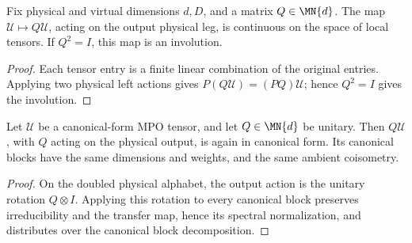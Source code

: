 \begin{lemma}
    \label{thm:mpu_continuous_involutive_left_action}
    \leanok
    Fix physical and virtual dimensions $d,D$, and a matrix $Q\in\MN{d}$.
    The map $\mathcal U\mapsto Q\mathcal U$, acting on the output physical
    leg, is continuous on the space of local tensors. If $Q^2=I$, this map
    is an involution.
\end{lemma}

\begin{proof}\leanok
    Each tensor entry is a finite linear combination of the original entries.
    Applying two physical left actions gives
    $P(Q\mathcal U)=(PQ)\mathcal U$; hence $Q^2=I$ gives the involution.
\end{proof}

\begin{lemma}
    \label{thm:mpu_canonical_form_physical_left_action}
    \leanok
    Let $\mathcal U$ be a canonical-form MPO tensor, and let
    $Q\in\MN{d}$ be unitary. Then $Q\mathcal U$, with $Q$ acting on the
    physical output, is again in canonical form. Its canonical blocks
    have the same dimensions and weights, and the same ambient
    coisometry.
\end{lemma}

\begin{proof}\leanok
    On the doubled physical alphabet, the output action is the unitary
    rotation $Q\otimes I$. Applying this rotation to every canonical block
    preserves irreducibility and the transfer map, hence its spectral
    normalization, and distributes over the canonical block decomposition.
\end{proof}

